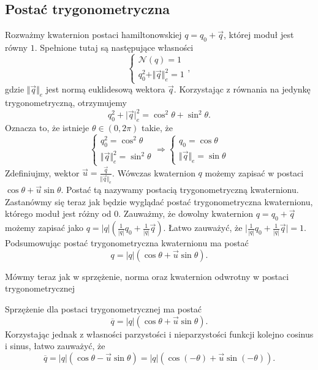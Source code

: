 \documentclass[a4paper,twoside,11pt,reqno]{mwrep}
\theoremstyle{plain} \newtheorem{twr}{Twierdzenie}
\theoremstyle{plain} \newtheorem{lem}{Lemat}
\theoremstyle{definition} \newtheorem{defi}{Definicja}
\theoremstyle{remark} \newtheorem*{wni}{Wniosek}
\theoremstyle{definition} \newtheorem{uwaga}{Uwaga}
\theoremstyle{definition}\newtheorem{prz}{Przykład}
\begin{document}
\subsection{Postać trygonometryczna}

Rozważmy kwaternion postaci hamiltonowskiej $q=q_0+\overrightarrow{q}$, której moduł jest równy $1$.
Spełnione tutaj są następujące własności
$$\left\{\begin{array}{l}
\mathcal{N}(q)=1\\
q_0^2 +\Vert\overrightarrow{q}\Vert_e^2= 1
\end{array} \right. ,$$
gdzie $\Vert \overrightarrow{q} \Vert_e$ jest normą euklidesową wektora $\overrightarrow{q}$.
Korzystając z równania na jedynkę trygonometryczną, otrzymujemy
$$q_0^2 + \big| \overrightarrow{q}\big|_e^2= \cos^2\theta + \sin^2\theta.$$
Oznacza to, że istnieje $\theta \in (0,2\pi)$ takie, że 
$$\left\{\begin{array}{l}
q_0^2=\cos^2\theta\\
\Vert\overrightarrow{q}\Vert_e^2=\sin^2\theta
\end{array} \right. \Rightarrow \left\{\begin{array}{l}
q_0=\cos\theta\\
\Vert\overrightarrow{q}\Vert_e=\sin\theta
\end{array} \right. $$
Zdefiniujmy, wektor $\overrightarrow{u} = \frac{\overrightarrow{q}}{\Vert\overrightarrow{q}\Vert_e}$.
Wówczas kwaternion $q$ możemy zapisać w postaci $\cos\theta + \overrightarrow{u}\sin\theta$.
Postać tą nazywamy postacią trygonometryczną kwaternionu.
Zastanówmy się teraz jak będzie wyglądać postać trygonometryczna kwaternionu,
którego moduł jest różny od $0$. Zauważmy, że dowolny kwaternion $q=q_0+\overrightarrow{q}$
możemy zapisać jako $q=|q|\left(\frac{1}{|q|}q_0+\frac{1}{|q|}\overrightarrow{q}\right)$.
Łatwo zauważyć, że $\Big|\frac{1}{|q|}q_0+\frac{1}{|q|}\overrightarrow{q}\Big|=1$.
Podsumowując postać trygonometryczna kwaternionu ma postać 
$$q = |q|(\cos\theta + \overrightarrow{u}\sin\theta).$$

Mówmy teraz jak w sprzężenie, norma oraz kwaternion odwrotny w postaci trygonometrycznej

Sprzężenie dla postaci trygonometrycznej ma postać
$$\overline{q} = |q|(\cos\theta + \overrightarrow{u}\sin\theta).$$
Korzystając jednak z własności parzystości i nieparzystości funkcji kolejno cosinus i sinus, 
łatwo zauważyć, że
$$\overline{q}=|q|(\cos\theta - \overrightarrow{u}\sin\theta)=
|q|(\cos(-\theta) + \overrightarrow{u}\sin(-\theta)). $$
\end{document}
